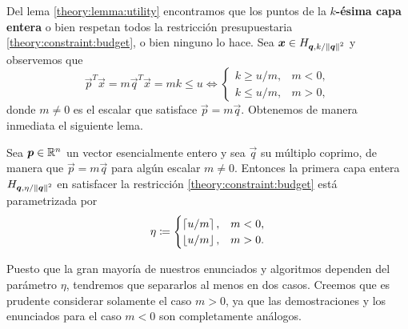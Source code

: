 Del lema \ref{theory:lemma:utility} encontramos que los puntos de la \textbf{$k$-ésima capa entera}
o bien respetan todos la restricción presupuestaria \eqref{theory:constraint:budget}, o bien ninguno
lo hace. Sea $\boldsymbol{x} \in H_{\boldsymbol{q}, k/\left\lVert \boldsymbol{q} \right\rVert^{2}}$ y observemos que
\begin{equation}
	\label{eq:eta-cases}
	\vec{p}^T\vec{x} = m\vec{q}^T\vec{x} = mk \leq u
	\iff
	\begin{cases}
		k \geq u/m, & m < 0, \\
		k \leq u/m, & m > 0,
	\end{cases}
\end{equation}
donde $m \neq 0$ es el escalar que satisface $\vec{p} = m\vec{q}$. Obtenemos de manera inmediata el
siguiente lema.

\begin{lemma}
	\label{phase-1:lemma:eta}
	Sea $\boldsymbol{p} \in \mathbb{R}^n$ un vector esencialmente entero y sea $\vec{q}$ su múltiplo coprimo, de
	manera que $\vec{p} = m\vec{q}$ para algún escalar $m \neq 0$. Entonces la primera capa entera
	$H_{\boldsymbol{q}, \eta/\left\lVert \boldsymbol{q} \right\rVert^{2}}$ en satisfacer la restricción \eqref{theory:constraint:budget} está
	parametrizada por
	\begin{equation}
		\label{lemma:eq:eta-cases}
		\eta \coloneq \begin{cases}
			\left\lceil u/m \right\rceil, & m < 0, \\
			\left\lfloor u/m \right\rfloor, & m > 0.
		\end{cases}
	\end{equation}
\end{lemma}

Puesto que la gran mayoría de nuestros enunciados y algoritmos dependen del parámetro
$\eta$, tendremos que separarlos al menos en dos casos. Creemos que es prudente
considerar solamente el caso $m > 0$, ya que las demostraciones y los enunciados para
el caso $m < 0$ son completamente análogos.

